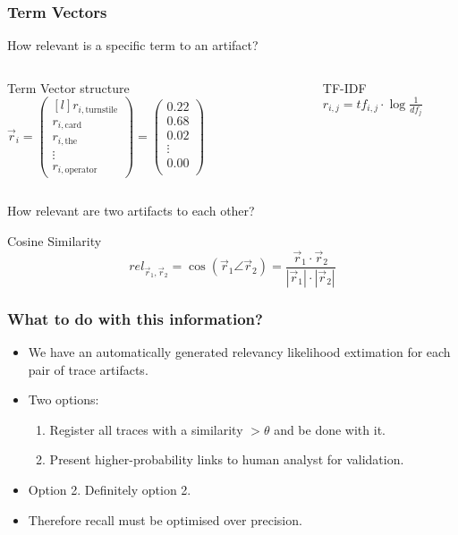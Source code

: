 \documentclass{beamer}
\begin{document}
\begin{frame}
\frametitle{Term Vectors}
How relevant is a specific term to an artifact?

\begin{columns}
\begin{block}{Term Vector structure}
\(
\vec{r}_i=
\begin{pmatrix*}[l]
  r_{i,\text{turnstile}}\\
  r_{i,\text{card}}\\
  r_{i,\text{the}}\\
  \vdots\\
  r_{i,\text{operator}}
\end{pmatrix*}
=
\begin{pmatrix}
  0.22\\
  0.68\\
  0.02\\
  \vdots\\
  0.00\\
\end{pmatrix}
\)
\end{block}

\pause

\begin{block}{TF-IDF}
\(
r_{i,j} = tf_{i,j}\cdot\log\frac{1}{df_j}
\)
\end{block}

\pause

\end{columns}

\vfill
How relevant are two artifacts to each other?

\begin{block}{Cosine Similarity}
  \[ rel_{\vec r_1, \vec r_2} = \cos(\vec r_1 \angle \vec r_2)
  = \frac{\vec r_1 \cdot \vec r_2}{|\vec r_1| \cdot |\vec r_2| } \]
\end{block}

\end{frame}

\begin{frame}
\frametitle{What to do with this information?}
\begin{itemize}
\item We have an automatically generated relevancy likelihood extimation for each pair of trace artifacts.
\item Two options:
  \begin{enumerate}
  \item Register all traces with a similarity $>\theta$ and be done with it.
  \item Present higher-probability links to human analyst for validation.
  \end{enumerate}
\item Option 2. Definitely option 2.
\item Therefore recall must be optimised over precision.
\end{itemize}
\end{frame}
\end{document}
